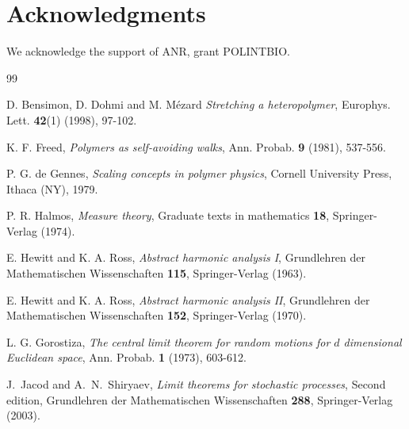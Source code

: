 \documentclass[a4paper,reqno,11pt]{amsart}
\numberwithin{equation}{section}
\begin{document}
\section*{Acknowledgments}
We acknowledge the support of ANR, grant POLINTBIO.




\bigskip

\begin{thebibliography}{99}

D. Bensimon, D. Dohmi and M. M\'ezard
\emph{Stretching a heteropolymer},
Europhys. Lett. {\bf 42}(1) (1998), 97-102.


K. F.  Freed, \emph{Polymers as self-avoiding walks},
 Ann. Probab. {\bf 9} (1981), 537-556.

P. G. de Gennes, \emph{
Scaling concepts in polymer physics},
Cornell University Press, Ithaca (NY), 1979.



 P. R. Halmos, \emph{Measure theory},
Graduate texts in mathematics {\bf 18}, Springer-Verlag (1974).

E. Hewitt and K. A. Ross,
\textit{Abstract harmonic analysis I},
Grundlehren der Mathematischen Wissenschaften {\bf 115},
Springer-Verlag (1963).

E. Hewitt and K. A. Ross,
\textit{Abstract harmonic analysis II}, Grundlehren der Mathematischen Wissenschaften {\bf 152},
Springer-Verlag (1970).

 L. G. Gorostiza, \emph{The central limit theorem for random motions
for $d$ dimensional Euclidean space}, Ann. Probab. {\bf 1} (1973), 603-612.

J.~Jacod and
A.~N.~Shiryaev, \emph{Limit theorems for stochastic processes}, Second edition, Grundlehren der Mathematischen Wissenschaften {\bf 288}, Springer-Verlag (2003).



\end{thebibliography}
\end{document}
